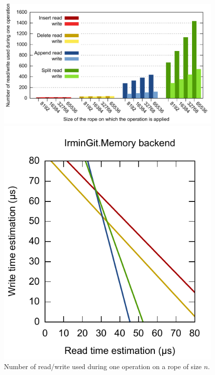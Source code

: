 \documentclass{article}
\begin{document}
\begin{figure}[hbt]
\centering
\includegraphics[scale=0.6]{images/rope_readwrite.pdf}
\caption{Number of read/write used during one operation on a rope of size $n$.}
\label{ropereadwrite}
\includegraphics[scale=0.6]{images/git_interp.pdf}

\end{figure}
\end{document}
